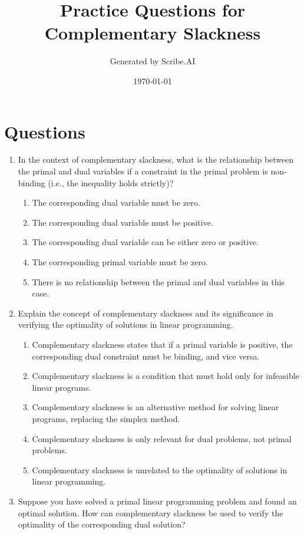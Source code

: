 \documentclass{article}%
\title{Practice Questions for Complementary Slackness}%
\author{Generated by Scribe.AI}%
\date{\today}%
\begin{document}
%
\normalsize%
\maketitle%
\section{Questions}%
\label{sec:Questions}%
\begin{enumerate}%
\item In the context of complementary slackness, what is the relationship between the primal and dual variables if a constraint in the primal problem is non-binding (i.e., the inequality holds strictly)?%
\begin{enumerate}%
\item The corresponding dual variable must be zero.%
\item The corresponding dual variable must be positive.%
\item The corresponding dual variable can be either zero or positive.%
\item The corresponding primal variable must be zero.%
\item There is no relationship between the primal and dual variables in this case.%
\end{enumerate}%
\vspace{1em}%
\item Explain the concept of complementary slackness and its significance in verifying the optimality of solutions in linear programming.%
\begin{enumerate}%
\item Complementary slackness states that if a primal variable is positive, the corresponding dual constraint must be binding, and vice versa.%
\item Complementary slackness is a condition that must hold only for infeasible linear programs.%
\item Complementary slackness is an alternative method for solving linear programs, replacing the simplex method.%
\item Complementary slackness is only relevant for dual problems, not primal problems.%
\item Complementary slackness is unrelated to the optimality of solutions in linear programming.%
\end{enumerate}%
\vspace{1em}%
\item Suppose you have solved a primal linear programming problem and found an optimal solution. How can complementary slackness be used to verify the optimality of the corresponding dual solution?%

\end{enumerate}
\end{document}
